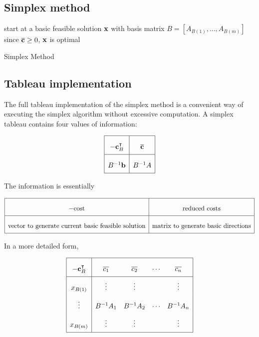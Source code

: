 \subsection{Simplex method}
\begin{algorithm*}[H]
	\SetAlgoLined{}
	start at a basic feasible solution \(\vb x\) with basis matrix \(B = [A_{B(1)}, \dots, A_{B(m)}]\)\;
	since \( \overline{\vb c} \geq 0 \), \( \vb x \) is optimal
	\caption{Simplex Method}
\end{algorithm*}

\subsection{Tableau implementation}
The full tableau implementation of the simplex method is a convenient way of executing the simplex algorithm without excessive computation.
A simplex tableau contains four values of information:

\[
	\arraycolsep=5pt\def\arraystretch{2.2}
	\begin{array}{|c|c|}\hline
		-\vb c_B^\transpose & \overline{\vb c} \\\hline
		B^{-1}\vb b         & B^{-1}A          \\\hline
	\end{array}
\]

\noindent The information is essentially

\[
	\arraycolsep=5pt\def\arraystretch{2.2}
	\begin{array}{|c|c|}
		\hline
		-\text{cost}                                              & \text{reduced costs}                       \\\hline
		\text{vector to generate current basic feasible solution} & \text{matrix to generate basic directions} \\\hline
	\end{array}
\]

\noindent In a more detailed form,

\[
	\arraycolsep=5pt\def\arraystretch{2.2}
	\begin{array}{|c|cccc|}\hline
		-\vb c_B^\transpose & \overline{c_1} & \overline{c_2} & \cdots & \overline{c_n} \\\hline
		x_{B(1)}            & \vdots         & \vdots         &        & \vdots         \\
		\vdots              & B^{-1} A_1     & B^{-1} A_2     & \cdots & B^{-1} A_n     \\
		x_{B(m)}            & \vdots         & \vdots         &        & \vdots         \\\hline
	\end{array}
\]

